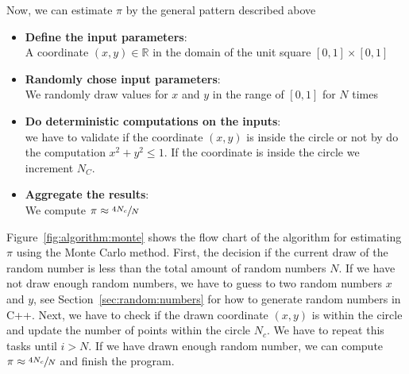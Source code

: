 \documentclass[11pt,fleqn]{book} %
\begin{document}
Now, we can estimate $\pi$ by the general pattern described above
\begin{itemize}
\item \textbf{Define the input parameters}: \\ A coordinate  $(x,y)\in\mathbb{R}$ in the domain of the unit square $[0,1]\times [0,1]$
\item\textbf{ Randomly chose input parameters}:\\ We randomly draw values for $x$ and $y$ in the range of $[0,1]$ for $N$ times
\item \textbf{Do deterministic computations on the inputs}:  \\
we have to validate if the coordinate $(x,y)$ is inside the circle or not by do the computation $x^2+y^2\leq 1$. If the coordinate is inside the circle we increment $N_C$.
\item \textbf{Aggregate the results}: \\
We compute $\pi\approx \sfrac{4N_c}{N}$
\end{itemize}
\vspace{0.25cm}

Figure~\ref{fig:algorithm:monte} shows the flow chart of the algorithm for estimating $\pi$ using the Monte Carlo method. First, the decision if the current draw of the random number is less than the total amount of random numbers $N$. If we have not draw enough random numbers, we have to guess to two random numbers $x$ and $y$, see Section~\ref{sec:random:numbers} for how to generate random numbers in C++. Next, we have to check if the drawn coordinate $(x,y)$ is within the circle and update the number of points within the circle $N_c$. We have to repeat this tasks until $i>N$. If we have drawn enough random number, we can compute $\pi\approx\sfrac{4N_c}{N}$ and finish the program.\\
\end{document}
